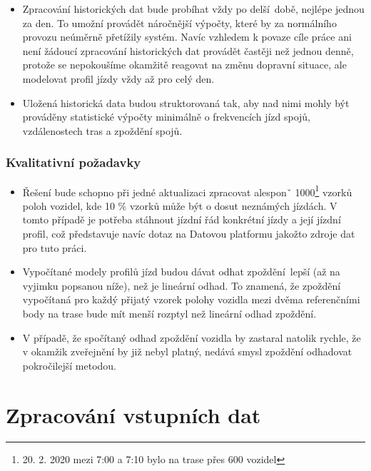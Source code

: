 \begin{itemize}
\item

Zpracování historických dat bude probíhat vždy po delší době, nejlépe jednou za den. To umožní provádět náročnější výpočty, které by za normálního provozu neúměrně přetížily systém. Navíc vzhledem k povaze cíle práce ani není žádoucí zpracování historických dat provádět častěji než jednou denně, protože se nepokoušíme okamžitě reagovat na změnu dopravní situace, ale modelovat profil jízdy vždy až pro celý den.

\item

Uložená historická data budou struktorovaná tak, aby nad nimi mohly být prováděny statistické výpočty minimálně o frekvencích jízd spojů, vzdálenostech tras a zpoždění spojů.
\end{itemize}

\subsubsection{Kvalitativní požadavky}

\begin{itemize}

	\item
	Řešení bude schopno při jedné aktualizaci zpracovat alesponˇ 1000\footnote{20. 2. 2020 mezi 7:00 a 7:10 bylo na trase přes 600 vozidel} vzorků poloh vozidel, kde 10 \% vzorků může být o dosut neznámých jízdách. V tomto případě je potřeba stáhnout jízdní řád konkrétní jízdy a její jízdní profil, což představuje navíc dotaz na Datovou platformu jakožto zdroje dat pro tuto práci.

	\item
	Vypočítané modely profilů jízd budou dávat odhat zpoždění lepší (až na vyjimku popsanou níže), než je lineární odhad. To znamená, že zpoždění vypočítaná pro každý přijatý vzorek polohy vozidla mezi dvěma referenčními body na trase bude mít menší rozptyl než lineární odhad zpoždění.

	\item
	V případě, že spočítaný odhad zpoždění vozidla by zastaral natolik rychle, že v okamžik zveřejnění by již nebyl platný, nedává smysl zpoždění odhadovat pokročilejší metodou.

\end{itemize}


\section{Zpracování vstupních dat}

